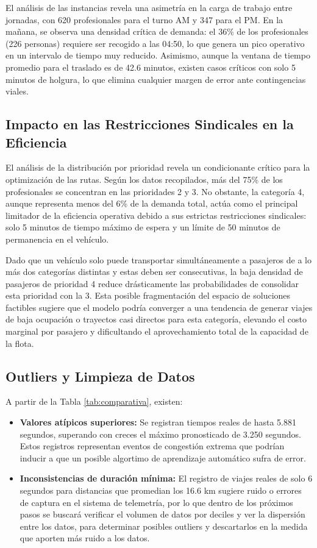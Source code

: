 El análisis de las instancias revela una asimetría en la carga de trabajo entre jornadas, con 620 profesionales para el turno AM y 347 para el PM. En la mañana, se observa una densidad crítica de demanda: el 36\% de los profesionales (226 personas) requiere ser recogido a las 04:50, lo que genera un pico operativo en un intervalo de tiempo muy reducido. Asimismo, aunque la ventana de tiempo promedio para el traslado es de 42.6 minutos, existen casos críticos con solo 5 minutos de holgura, lo que elimina cualquier margen de error ante contingencias viales.

\subsection{Impacto en las Restricciones Sindicales en la Eficiencia}

El análisis de la distribución por prioridad revela un condicionante crítico para la optimización de las rutas. Según los datos recopilados, más del 75\% de los profesionales se concentran en las prioridades 2 y 3. No obstante, la categoría 4, aunque representa menos del 6\% de la demanda total, actúa como el principal limitador de la eficiencia operativa debido a sus estrictas restricciones sindicales: solo 5 minutos de tiempo máximo de espera y un límite de 50 minutos de permanencia en el vehículo.

Dado que un vehículo solo puede transportar simultáneamente a pasajeros de a lo más dos categorías distintas y estas deben ser consecutivas, la baja densidad de pasajeros de prioridad 4 reduce drásticamente las probabilidades de consolidar esta prioridad con la 3. Esta posible fragmentación del espacio de soluciones factibles sugiere que el modelo podría converger a una tendencia de generar viajes de baja ocupación o trayectos casi directos para esta categoría, elevando el costo marginal por pasajero y dificultando el aprovechamiento total de la capacidad de la flota.

\subsection{Outliers y Limpieza de Datos}
A partir de la Tabla \ref{tab:comparativa}, existen:
\begin{itemize}
    \item \textbf{Valores atípicos superiores:} Se registran tiempos reales de hasta 5.881 segundos, superando con creces el máximo pronosticado de 3.250 segundos. Estos registros representan eventos de congestión extrema que podrían inducir a que un posible algortimo de aprendizaje automático sufra de error.
    
    \item \textbf{Inconsistencias de duración mínima:} El registro de viajes reales de solo 6 segundos para distancias que promedian los 16.6 km sugiere ruido o errores de captura en el sistema de telemetría, por lo que dentro de los próximos pasos se buscará verificar el volumen de datos por deciles y ver la dispersión entre los datos, para determinar posibles outliers y descartarlos en la medida que aporten más ruido a los datos.
\end{itemize}




